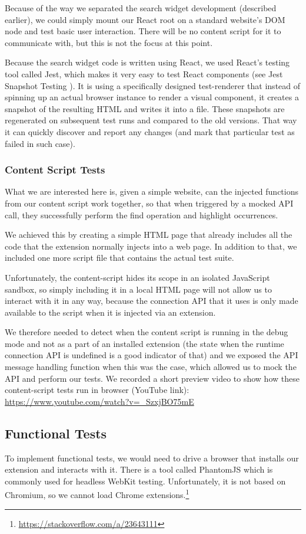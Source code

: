\documentclass[bsc,frontabs,twoside,singlespacing,parskip,deptreport]{infthesis}
\begin{document}
Because of the way we separated the search widget development (described earlier), we could simply mount our React root on a standard website's DOM node and test basic user interaction. There will be no content script for it to communicate with, but this is not the focus at this point.

Because the search widget code is written using React, we used React's testing tool called Jest, which makes it very easy to test React components (see Jest Snapshot Testing \cite{A13}). It is using a specifically designed test-renderer that instead of spinning up an actual browser instance to render a visual component, it creates a snapshot of the resulting HTML and writes it into a file. These snapshots are regenerated on subsequent test runs and compared to the old versions. That way it can quickly discover and report any changes (and mark that particular test as failed in such case).

\subsubsection{Content Script Tests}
What we are interested here is, given a simple website, can the injected functions from our content script work together, so that when triggered by a mocked API call, they successfully perform the find operation and highlight occurrences.

We achieved this by creating a simple HTML page that already includes all the code that the extension normally injects into a web page. In addition to that, we included one more script file that contains the actual test suite.

Unfortunately, the content-script hides its scope in an isolated JavaScript sandbox, so simply including it in a local HTML page will not allow us to interact with it in any way, because the connection API that it uses is only made available to the script when it is injected via an extension.

We therefore needed to detect when the content script is running in the debug mode and not as a part of an installed extension (the state when the runtime connection API is undefined is a good indicator of that) and we exposed the API message handling function when this was the case, which allowed us to mock the API and perform our tests. We recorded a short preview video to show how these content-script tests run in browser (YouTube link): \url{https://www.youtube.com/watch?v=_SzxjBO75mE}

\subsection{Functional Tests}
To implement functional tests, we would need to drive a browser that installs our extension and interacts with it. There is a tool called PhantomJS \cite{A14} which is commonly used for headless WebKit testing. Unfortunately, it is not based on Chromium, so we cannot load Chrome extensions.\footnote{\url{https://stackoverflow.com/a/23643111}}
\end{document}
